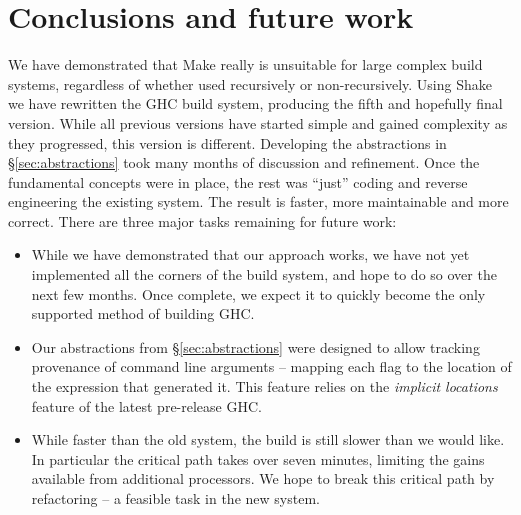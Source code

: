 \section{Conclusions and future work\label{section-conclusions}}

We have demonstrated that Make really is unsuitable for large complex build
systems, regardless of whether used recursively or non-recursively. Using Shake
we have rewritten the GHC build system, producing the fifth and hopefully final
version. While all previous versions have started simple and gained complexity
as they progressed, this version is different. Developing the abstractions in
\S\ref{sec:abstractions} took many months of discussion and refinement. Once the
fundamental concepts were in place, the rest was ``just'' coding and reverse
engineering the existing system. The result is faster, more maintainable and
more correct. There are three major tasks remaining for future work:

\begin{itemize}
\item While we have demonstrated that our approach works, we have not yet
implemented all the corners of the build system, and hope to do so over the next
few months. Once complete, we expect it to quickly become the only supported
method of building GHC.

\item Our abstractions from \S\ref{sec:abstractions} were designed to allow
tracking provenance of command line arguments -- mapping each flag to the
location of the expression that generated it. This feature relies on the
\emph{implicit locations} feature of the latest pre-release GHC.

\item While faster than the old system, the build is still slower than we would
like. In particular the critical path takes over seven minutes, limiting the
gains available from additional processors. We hope to break this critical path
by refactoring -- a feasible task in the new system.
\end{itemize}
